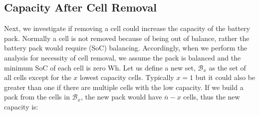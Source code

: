 \documentclass[10pt,twocolumn]{IEEEtran}
\begin{document}
%
%
%

\subsection{Capacity After Cell Removal }
Next, we investigate  if removing a cell could increase the capacity of the battery pack.
Normally  a cell is not removed because of being out of balance,  rather the battery  pack would require (SoC) balancing.
Accordingly,  when we perform the  analysis for necessity of cell removal, we assume the pack is balanced and the minimum SoC of each cell is zero Wh.
Let us define a new set, $\mathcal{B}_x$ as the set of all cells except for the $x$ lowest capacity cells.
Typically $x=1$ but it could also be greater than one if there are multiple cells with the low capacity.
If we build a pack from the cells in  $\mathcal{B}_x$, the new pack would have $\overline{n} - x$ cells, thus the new capacity is:
\end{document}
